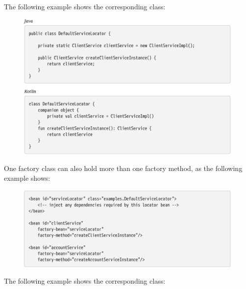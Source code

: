 The following example shows the corresponding class:

\begin{figure}[ht]
    \centering
    \includegraphics[width=1\linewidth]{./Figure/IMG_code_18.png}
\end{figure}

\newpage
One factory class can also hold more than one factory method, as the following example shows:

\begin{figure}[ht]
    \centering
    \includegraphics[width=1\linewidth]{./Figure/IMG_code_19.png}
\end{figure}

\newpage
The following example shows the corresponding class:

